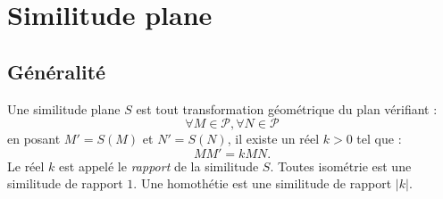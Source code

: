 
\TCDLessonStyleOn
\providecommand{\Plan}{\mathscr{P}}
\providecommand{\Id}{\mathrm{Id}}
\providecommand{\Droite}{(\mathscr{D})}
\providecommand{\DroiteP}{(\mathscr{D}')}
\providecommand{\Arg}[1]{\mathrm{Arg}\left( #1 \right)}
\chapter{Similitude plane}
      \section{G\'en\'eralit\'e}
            Une similitude plane $S$ est tout transformation g\'eom\'etrique du plan v\'erifiant :
                  \[
                        \forall M \in \Plan , \forall N \in \Plan
                  \]
                  en posant $M' = S(M)$ et $N' = S(N)$, il existe un r\'eel $k>0$ tel que :
                  \[
                        MM' = k MN.
                  \]
            Le r\'eel $k$ est appel\'e le \emph{rapport} de la similitude $S$.
            Toutes isom\'etrie est une similitude de rapport $1$.
            Une homoth\'etie est une similitude de rapport $|k|$.
